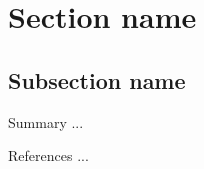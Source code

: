 \documentclass{beamer}
\begin{document}
    \frame{\titlepage}
    
    \section{Section name}
    \subsection{Subsection name}
    \begin{frame}{Summary}
        ...
    \end{frame}
    
    \appendix
    \begin{frame}{References}
        ...
    \end{frame}
    
    
\end{document}
